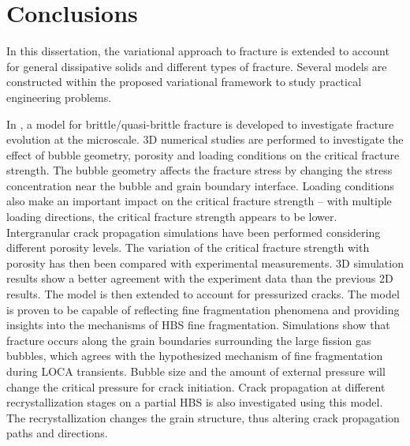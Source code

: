 \chapter{Conclusions}
\label{section: Chapter6}

In this dissertation, the variational approach to fracture is extended to account for general dissipative solids and different types of fracture. Several models are constructed within the proposed variational framework to study practical engineering problems.

In , a model for brittle/quasi-brittle fracture is developed to investigate fracture evolution at the microscale. 3D numerical studies are performed to investigate the effect of bubble geometry, porosity and loading conditions on the critical fracture strength. The bubble geometry affects the fracture stress by changing the stress concentration near the bubble and grain boundary interface. Loading conditions also make an important impact on the critical fracture strength -- with multiple loading directions, the critical fracture strength appears to be lower. Intergranular crack propagation simulations have been performed considering different porosity levels. The variation of the critical fracture strength with porosity has then been compared with experimental measurements. 3D simulation results show a better agreement with the experiment data than the previous 2D results. The model is then extended to account for pressurized cracks. The model is proven to be capable of reflecting fine fragmentation phenomena and providing insights into the mechanisms of HBS fine fragmentation. Simulations show that fracture occurs along the grain boundaries surrounding the large fission gas bubbles, which agrees with the hypothesized mechanism of fine fragmentation during LOCA transients. Bubble size and the amount of external pressure will change the critical pressure for crack initiation. Crack propagation at different recrystallization stages on a partial HBS is also investigated using this model. The recrystallization changes the grain structure, thus altering crack propagation paths and directions.

